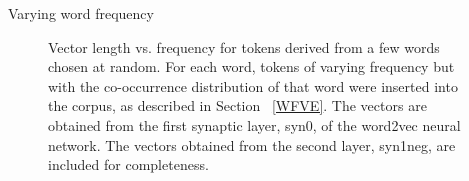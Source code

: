 \documentclass{article} %
\begin{document}
\begin{section}{Varying word frequency}
\begin{figure}
	\caption{ Vector length vs. frequency for tokens derived from a
          few words chosen at random.  For each word, tokens of varying
          frequency but with the co-occurrence distribution of that word
          were inserted into the corpus, as described in
          Section ~\ref{WFVE}.  The vectors are obtained from the first
          synaptic layer, syn0, of the word2vec neural network.  The
          vectors obtained from the second layer, syn1neg, are
          included for completeness.  }
	\label{fig:word-frequency-experiment-graph}
\end{figure}
\end{section}
\end{document}
